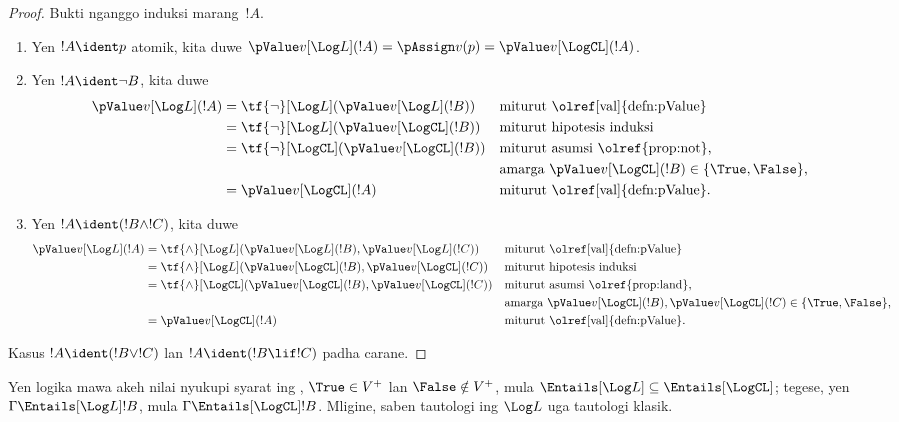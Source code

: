 \documentclass[../../../include/open-logic-section]{subfiles}
\begin{document}
\begin{proof}
  Bukti nganggo induksi marang~$!A$.
  \begin{enumerate}
  \item Yen $!A \ident p$ atomik, kita duwe $\pValue v[\Log L](!A) =
  \pAssign v(p) = \pValue
  v[\LogCL](!A)$.
  \item Yen $!A \ident \lnot B$, kita duwe
  \begin{align*}
    \pValue v[\Log L](!A) & = \tf{\lnot}[\Log L](\pValue v[\Log L](!B)) & &\text{miturut \olref[val]{defn:pValue}}\\
    & = \tf{\lnot}[\Log L](\pValue v[\LogCL](!B)) && \text{miturut hipotesis induksi}\\
    & = \tf{\lnot}[\LogCL](\pValue v[\LogCL](!B)) 
&&\text{miturut asumsi \olref{prop:not},}\\
&&&\text{amarga $\pValue v[\LogCL](!B) \in \{\True, \False\}$,}\\
& = \pValue v[\LogCL](!A) &&\text{miturut \olref[val]{defn:pValue}}.
\end{align*}
\item Yen $!A \ident (!B \land !C)$, kita duwe
\begin{align*}
  \pValue v[\Log L](!A) & = \tf{\land}[\Log L](\pValue v[\Log L](!B), \pValue v[\Log L](!C)) & &\text{miturut \olref[val]{defn:pValue}}\\
  & = \tf{\land}[\Log L](\pValue v[\LogCL](!B),\pValue v[\LogCL](!C)) && \text{miturut hipotesis induksi}\\
  & = \tf{\land}[\LogCL](\pValue v[\LogCL](!B),\pValue v[\LogCL](!C)) 
&&\text{miturut asumsi \olref{prop:land},}\\
&&&\text{amarga $\pValue v[\LogCL](!B),\pValue v[\LogCL](!C) \in \{\True, \False\}$,}\\
& = \pValue v[\LogCL](!A) &&\text{miturut \olref[val]{defn:pValue}}.
\end{align*}
\end{enumerate}
Kasus $!A \ident (!B \lor !C)$ lan $!A \ident (!B \lif !C)$
padha carane.
\end{proof}

\begin{cor}
  Yen logika mawa akeh nilai nyukupi syarat ing
  , $\True \in V^+$ lan $\False \notin V^+$,
  mula ${\Entails[\Log L]} \subseteq {\Entails[\LogCL]}$;
  tegese, yen $\Gamma
  \Entails[\Log L] !B$, mula $\Gamma \Entails[\LogCL] !B$.
  Mligine, saben tautologi ing $\Log L$ uga tautologi klasik.
\end{cor}
\end{document}
